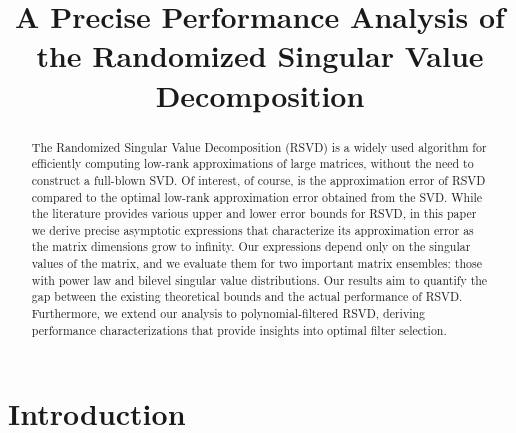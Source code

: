 \documentclass[conference]{IEEEtran}
\begin{document}
\title{A Precise Performance Analysis of the Randomized Singular Value Decomposition\\}

\author{
\and
{}
\and
{}
}

\maketitle

\def\thefootnote{*}

\begin{abstract}
The Randomized Singular Value Decomposition (RSVD) is a widely used algorithm for efficiently computing low-rank approximations of large matrices, without the need to construct a full-blown SVD. Of interest, of course, is the approximation error of RSVD compared to the optimal low-rank approximation error obtained from the SVD. While the literature provides various upper and lower error bounds for RSVD, in this paper we derive precise asymptotic expressions that characterize its approximation error as the matrix dimensions grow to infinity. Our expressions depend only on the singular values of the matrix, and we evaluate them for two important matrix ensembles: those with power law and bilevel singular value distributions. Our results aim to quantify the gap between the existing theoretical bounds and the actual performance of RSVD. Furthermore, we extend our analysis to polynomial-filtered RSVD, deriving performance characterizations that provide insights into optimal filter selection.
\end{abstract}

\section{Introduction}
\end{document}
